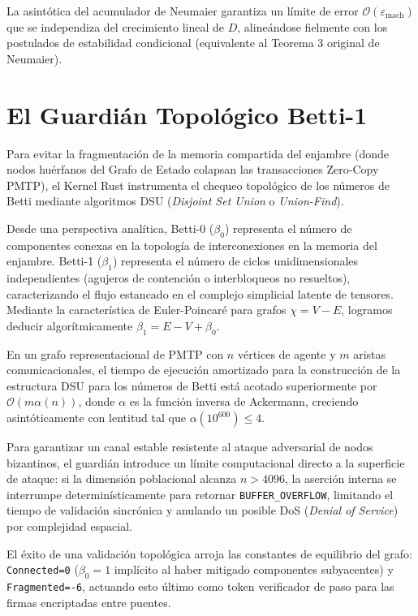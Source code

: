 La asintótica del acumulador de Neumaier garantiza un límite de error $\mathcal{O}(\varepsilon_{\text{mach}})$ que se independiza del crecimiento lineal de $D$, alineándose fielmente con los postulados de estabilidad condicional (equivalente al Teorema 3 original de Neumaier).

\section{El Guardián Topológico Betti-1}

Para evitar la fragmentación de la memoria compartida del enjambre (donde nodos huérfanos del Grafo de Estado colapsan las transacciones Zero-Copy PMTP), el Kernel Rust instrumenta el chequeo topológico de los números de Betti mediante algoritmos DSU (\textit{Disjoint Set Union} o \textit{Union-Find}).

Desde una perspectiva analítica, Betti-0 ($\beta_0$) representa el número de componentes conexas en la topología de interconexiones en la memoria del enjambre. Betti-1 ($\beta_1$) representa el número de ciclos unidimensionales independientes (agujeros de contención o interbloqueos no resueltos), caracterizando el flujo estancado en el complejo simplicial latente de tensores. Mediante la característica de Euler-Poincaré para grafos $\chi = V - E$, logramos deducir algorítmicamente $\beta_1 = E - V + \beta_0$.

\begin{theorem}
En un grafo representacional de PMTP con $n$ vértices de agente y $m$ aristas comunicacionales, el tiempo de ejecución amortizado para la construcción de la estructura DSU para los números de Betti está acotado superiormente por $\mathcal{O}(m \alpha(n))$, donde $\alpha$ es la función inversa de Ackermann, creciendo asintóticamente con lentitud tal que $\alpha(10^{600}) \le 4$.
\end{theorem}

Para garantizar un canal estable resistente al ataque adversarial de nodos bizantinos, el guardián introduce un límite computacional directo a la superficie de ataque: si la dimensión poblacional alcanza $n > 4096$, la aserción interna se interrumpe determinísticamente para retornar \texttt{BUFFER\_OVERFLOW}, limitando el tiempo de validación sincrónica y anulando un posible DoS (\textit{Denial of Service}) por complejidad espacial. 

El éxito de una validación topológica arroja las constantes de equilibrio del grafo: \texttt{Connected=0} ($\beta_0 = 1$ implícito al haber mitigado componentes subyacentes) y \texttt{Fragmented=-6}, actuando esto último como token verificador de paso para las firmas encriptadas entre puentes.

